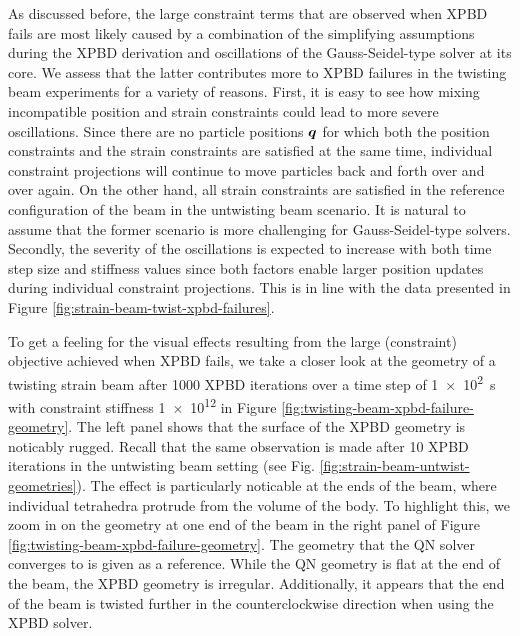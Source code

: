 As discussed before, the large constraint terms that are observed when XPBD fails are most likely caused by a combination of the simplifying 
assumptions during the XPBD derivation and oscillations of the Gauss-Seidel-type solver at its core. We assess that the latter contributes 
more to XPBD failures in the twisting beam experiments for a variety of reasons. First, it is easy to see how mixing incompatible 
position and strain constraints could lead to more severe oscillations. Since there are no particle positions $\bm{q}$ for which both the position constraints and the 
strain constraints are satisfied at the same time, individual constraint projections will continue to move particles back and forth over and over again. 
On the other hand, all strain constraints are satisfied in the reference configuration of the beam in the untwisting beam scenario. It is natural to 
assume that the former scenario is more challenging for Gauss-Seidel-type solvers. Secondly, the severity of the oscillations is expected to increase with both 
time step size and stiffness values since both factors enable larger position updates during individual constraint projections. This is in line with the 
data presented in Figure \ref{fig:strain-beam-twist-xpbd-failures}.

To get a feeling for the visual effects resulting from the large (constraint) objective achieved when XPBD fails, we take a closer look at the 
geometry of a twisting strain beam after 1000 XPBD iterations over a time step of \SI{1e2}{\second} with constraint stiffness \num{1e12} in 
Figure \ref{fig:twisting-beam-xpbd-failure-geometry}. The left panel shows that the surface of the XPBD geometry is noticably rugged. Recall that 
the same observation is made after 10 XPBD iterations in the untwisting beam setting (see Fig. \ref{fig:strain-beam-untwist-geometries}). The 
effect is particularly noticable at the ends of the beam, where individual tetrahedra protrude from the volume of the body. To highlight this, 
we zoom in on the geometry at one end of the beam in the right panel of Figure \ref{fig:twisting-beam-xpbd-failure-geometry}. The geometry that the QN solver 
converges to is given as a reference. While the QN geometry is flat at the end of the beam, the XPBD geometry is irregular. Additionally, it 
appears that the end of the beam is twisted further in the counterclockwise direction when using the XPBD solver.

